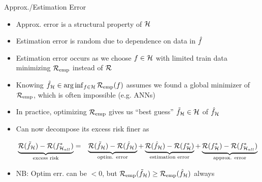 \documentclass[11pt,compress,t,notes=noshow, xcolor=table]{beamer}
\begin{document}
\begin{vbframe}{Approx./Estimation Error }
    
\begin{itemize}
    \item Approx. error is a structural property of $\mathcal{H}$
    \item Estimation error is random due to dependence on data in $\hat{f}$
    \item Estimation error occurs as we choose $f \in \mathcal{H}$ with limited train data minimizing $\mathcal{R}_{\text{emp}}$ instead of $\mathcal{R}$

\item Knowing $\hat{f}_{\mathcal{H}} \in \arg\inf_{f \in \mathcal{H}} \mathcal{R}_{\text{emp}}(f)$ assumes we found a global minimizer of $\mathcal{R}_{\text{emp}}$, which is often impossible (e.g. ANNs) 

\item In practice, optimizing $\mathcal{R}_{\text{emp}}$ gives us ``best guess'' $\tilde{f}_{\mathcal{H}} \in \mathcal{H}$ of $\hat{f}_{\mathcal{H}}$ 

\item Can now decompose its excess risk finer as

\begin{eqnarray*}
    \underbrace{\mathcal{R}(\tilde{f}_{\mathcal{H}}) - \mathcal{R}(f^{\ast}_{\mathcal{H}_{all}})}_{\text{excess risk}} &=& \underbrace{\mathcal{R}(\tilde{f}_{\mathcal{H}}) - \mathcal{R}(\hat{f}_{\mathcal{H}})}_{\text{optim. error}} + \underbrace{\mathcal{R}(\hat{f}_{\mathcal{H}}) - \mathcal{R}(f^{\ast}_{\mathcal{H}})}_{\text{estimation error}} + \underbrace{\mathcal{R}(f^{\ast}_{\mathcal{H}}) -  \mathcal{R}(f^{\ast}_{\mathcal{H}_{all}})}_{\text{approx. error}} 
\end{eqnarray*}

\item NB: Optim err. can be $< 0$, but $\mathcal{R}_{\text{emp}}(\tilde{f}_{\mathcal{H}}) \geq \mathcal{R}_{\text{emp}}(\hat{f}_{\mathcal{H}})$ always

\end{itemize}

\end{vbframe}
\end{document}
